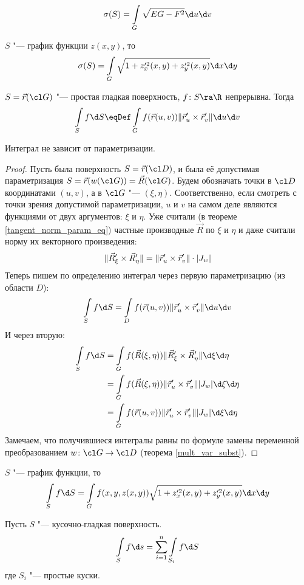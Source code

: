 \begin{conseq}
	\[
		\sigma(S) = \int\limits_G \sqrt{EG - F^2} \d u \d v
	\]
\end{conseq}

\begin{conseq}
	$S$ "--- график функции $z(x, y)$, то
	\[
		\sigma(S) = \int\limits_G \sqrt{1 + z_x'^2(x, y) + z_y'^2(x, y)} \d x \d y
	\]
\end{conseq}

\begin{Def}
	$S = \vec r(\cl G)$ "--- простая гладкая поверхность, $f\colon S \ra \R$ непрерывна.
	Тогда
	\[
		\int\limits_S f \d S \eqDef \int\limits_G f(\vec r(u, v)) \| \vec r_u' \times \vec r_v' \| \d u \d v
	\]
\end{Def}

\begin{theorem}
	Интеграл не зависит от параметризации.
\end{theorem}
\begin{proof}
	Пусть была поверхность $S = \vec r(\cl D)$, и была её допустимая параметризация
	$S = \vec r(w(\cl G)) = \vec R(\cl G)$.
	Будем обозначать точки в $\cl D$ координатами $(u, v)$, а в $\cl G$ "--- $(\xi, \eta)$.
	Соответственно, если смотреть с точки зрения допустимой параметризации, $u$ и $v$ на самом деле являются функциями от двух аргументов: $\xi$ и $\eta$.
	Уже считали (в теореме \ref{tangent_norm_param_eq}) частные производные $\vec R$ по $\xi$ и $\eta$ и даже считали норму их векторного произведения:
	\[
		\|\vec R_\xi' \times \vec R_\eta'\| = \|\vec r_u' \times \vec r_v'\| \cdot |J_w| \\
	\]
	Теперь пишем по определению интеграл через первую параметризацию (из области $D$):
	\[
		\int\limits_S f \d S = \int\limits_D f(\vec r(u, v)) \|\vec r_u' \times \vec r_v'\| \d u \d v \\
	\]
	И через вторую:
	\begin{align*}
		\int\limits_S f \d S
		&= \int\limits_G f(\vec R(\xi, \eta)) \|\vec R_\xi' \times \vec R_\eta'\| \d \xi \d \eta \\
		&= \int\limits_G f(\vec R(\xi, \eta)) \|\vec r_u' \times \vec r_v'\| |J_w| \d \xi \d \eta \\
		&= \int\limits_G f(\vec r(u, v)) \|\vec r_u' \times \vec r_v'\| |J_w| \d \xi \d \eta
	\end{align*}
	Замечаем, что получившиеся интегралы равны по формуле замены переменной преобразованием $w \colon \cl G \to \cl D$ (теорема \ref{mult_var_subst}).
\end{proof}

\begin{Rem}
	$S$ "--- график функции, то
	\[ \int\limits_S f \d S = \int\limits_G f(x, y, z(x, y)) \sqrt{1 + z_x'^2(x, y) + z_y'^2(x, y)} \d x \d y \]
\end{Rem}

\begin{Def}
	Пусть $S$ "--- кусочно-гладкая поверхность.
	\[ \int\limits_S f \d s = \sum_{i=1}^n \int\limits_{S_i} f \d S \]
	где $S_i$ "--- простые куски.
\end{Def}
